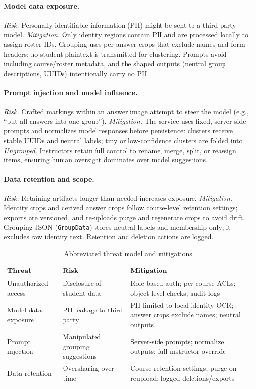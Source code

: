 \documentclass[ms,twoside,print]{nuthesis}
\begin{document}
\paragraph{Model data exposure.}
\emph{Risk.} Personally identifiable information (PII) might be sent to a third-party model. \emph{Mitigation.} Only identity regions contain PII and are processed locally to assign roster IDs. Grouping uses per-answer crops that exclude names and form headers; no student plaintext is transmitted for clustering. Prompts avoid including course/roster metadata, and the shaped outputs (neutral group descriptions, UUIDs) intentionally carry no PII.

\paragraph{Prompt injection and model influence.}
\emph{Risk.} Crafted markings within an answer image attempt to steer the model (e.g., \enquote{put all answers into one group}). \emph{Mitigation.} The service uses fixed, server-side prompts and normalizes model responses before persistence: clusters receive stable UUIDs and neutral labels; tiny or low-confidence clusters are folded into \emph{Ungrouped}. Instructors retain full control to rename, merge, split, or reassign items, ensuring human oversight dominates over model suggestions.

\paragraph{Data retention and scope.}
\emph{Risk.} Retaining artifacts longer than needed increases exposure. \emph{Mitigation.} Identity crops and derived answer crops follow course-level retention settings; exports are versioned, and re-uploads purge and regenerate crops to avoid drift. Grouping JSON (\texttt{GroupData}) stores neutral labels and membership only; it excludes raw identity text. Retention and deletion actions are logged.

\begin{table}[H]\centering
\caption{Abbreviated threat model and mitigations}\label{tab:threats}
\begin{tabularx}{\textwidth}{@{}p{3.8cm}Xp{4.6cm}@{}}
\toprule
\textbf{Threat} & \textbf{Risk} & \textbf{Mitigation} \\
\midrule
Unauthorized access & Disclosure of student data & Role-based auth; per-course ACLs; object-level checks; audit logs \\
Model data exposure & PII leakage to third party & PII limited to local identity OCR; answer crops exclude names; neutral outputs \\
Prompt injection & Manipulated grouping suggestions & Server-side prompts; normalize outputs; full instructor override \\
Data retention & Oversharing over time & Course retention settings; purge-on-reupload; logged deletions/exports \\
\bottomrule
\end{tabularx}
\end{table}
\end{document}
